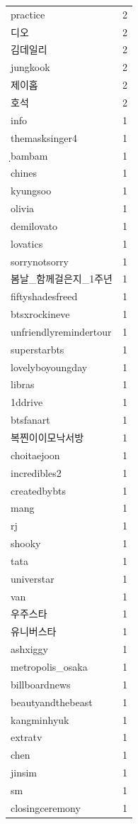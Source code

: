 \begin{tabular}{lr}
practice & 2 \\
디오 & 2 \\
김데일리 & 2 \\
jungkook & 2 \\
제이홉 & 2 \\
호석 & 2 \\
info & 1 \\
themasksinger4 & 1 \\
ฺbambam & 1 \\
chines & 1 \\
kyungsoo & 1 \\
olivia & 1 \\
demilovato & 1 \\
lovatics & 1 \\
sorrynotsorry & 1 \\
봄날\_함께걸은지\_1주년 & 1 \\
fiftyshadesfreed & 1 \\
btsxrockineve & 1 \\
unfriendlyremindertour & 1 \\
superstarbts & 1 \\
lovelyboyoungday & 1 \\
libras & 1 \\
1ddrive & 1 \\
btsfanart & 1 \\
복찐이이모낙서방 & 1 \\
choitaejoon & 1 \\
incredibles2 & 1 \\
createdbybts & 1 \\
mang & 1 \\
rj & 1 \\
shooky & 1 \\
tata & 1 \\
universtar & 1 \\
van & 1 \\
우주스타 & 1 \\
유니버스타 & 1 \\
ashxiggy & 1 \\
metropolis\_osaka & 1 \\
billboardnews & 1 \\
beautyandthebeast & 1 \\
kangminhyuk & 1 \\
extratv & 1 \\
chen & 1 \\
jinsim & 1 \\
sm & 1 \\
closingceremony & 1 \\

\end{tabular}
